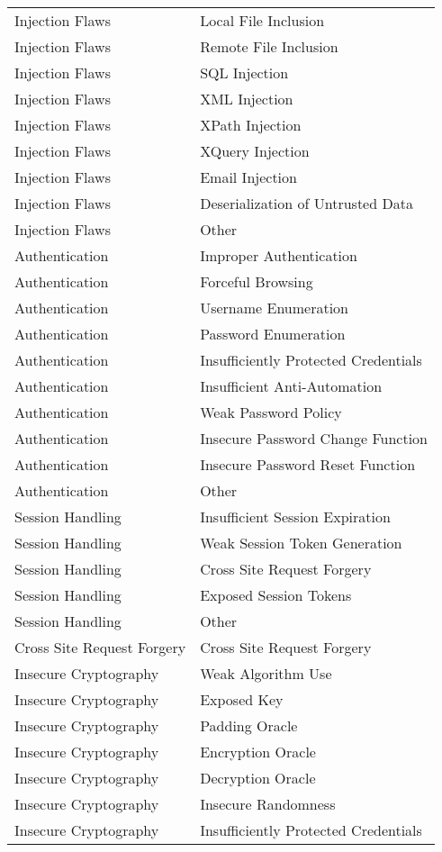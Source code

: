 \begin{longtable}{p{} | p{} }
Injection Flaws& Local File Inclusion\\
Injection Flaws& Remote File Inclusion\\
Injection Flaws& SQL Injection\\
Injection Flaws& XML Injection\\
Injection Flaws& XPath Injection\\
Injection Flaws& XQuery Injection\\
Injection Flaws& Email Injection\\
Injection Flaws& Deserialization of Untrusted Data\\
Injection Flaws& Other\\
Authentication& Improper Authentication\\
Authentication& Forceful Browsing\\
Authentication& Username Enumeration\\
Authentication& Password Enumeration\\
Authentication& Insufficiently Protected Credentials\\
Authentication& Insufficient Anti-Automation\\
Authentication& Weak Password Policy\\
Authentication& Insecure Password Change Function\\
Authentication& Insecure Password Reset Function\\
Authentication& Other\\
Session Handling& Insufficient Session Expiration\\
Session Handling& Weak Session Token Generation\\
Session Handling& Cross Site Request Forgery\\
Session Handling& Exposed Session Tokens\\
Session Handling& Other\\
Cross Site Request Forgery& Cross Site Request Forgery\\
Insecure Cryptography& Weak Algorithm Use\\
Insecure Cryptography& Exposed Key\\
Insecure Cryptography& Padding Oracle\\
Insecure Cryptography& Encryption Oracle\\
Insecure Cryptography& Decryption Oracle\\
Insecure Cryptography& Insecure Randomness\\
Insecure Cryptography& Insufficiently Protected Credentials\\

\end{longtable}
